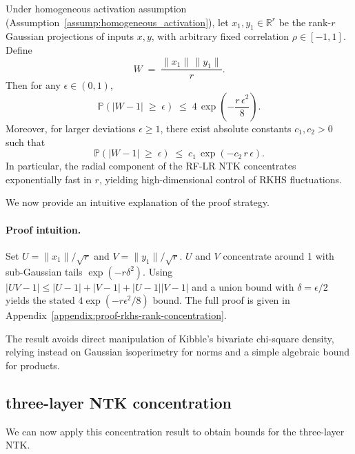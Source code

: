 \begin{theorem}\label{thm:rkhs_rank_concentration}
Under homogeneous activation assumption (Assumption~\ref{assump:homogeneous_activation}), let \( x_1, y_1 \in \mathbb{R}^r \) be the rank-\( r \) Gaussian projections of inputs \( x, y \), with arbitrary fixed correlation \( \rho \in [-1,1] \). Define
\[
W \;=\; \frac{\|x_1\|\,\|y_1\|}{r}.
\]
Then for any \( \epsilon \in (0,1) \),
\[
\mathbb{P}\!\left(\left|W-1\right|\;\ge\;\epsilon\right)\;\le\;4\,\exp\!\left(-\frac{r\,\epsilon^2}{8}\right).
\]
Moreover, for larger deviations \( \epsilon \ge 1 \), there exist absolute constants \( c_1,c_2>0 \) such that
\[
\mathbb{P}\!\left(\left|W-1\right|\;\ge\;\epsilon\right)\;\le\;c_1\,\exp\!\left(-c_2\,r\,\epsilon\right).
\]
In particular, the radial component of the RF-LR NTK concentrates exponentially fast in \( r \), yielding high-dimensional control of RKHS fluctuations.
\end{theorem}

We now provide an intuitive explanation of the proof strategy.

\paragraph{Proof intuition.}
Set \( U=\|x_1\|/\sqrt{r} \) and \( V=\|y_1\|/\sqrt{r} \). \( U \) and \( V \) concentrate around 1 with sub-Gaussian tails \( \exp(-r\delta^2) \). Using \( |UV-1|\le |U-1|+|V-1|+|U-1||V-1| \) and a union bound with \( \delta=\epsilon/2 \) yields the stated \( 4\exp(-r\epsilon^2/8) \) bound. The full proof is given in Appendix~\ref{appendix:proof-rkhs-rank-concentration}.
\begin{remark}
The result avoids direct manipulation of Kibble's bivariate chi-square density, relying instead on Gaussian isoperimetry for norms and a simple algebraic bound for products.
\end{remark}

\vspace{0.5em}
\subsection{three-layer NTK concentration}\label{subsec:three-layer-ntk-concentration}
We can now apply this concentration result to obtain bounds for the three-layer NTK.

